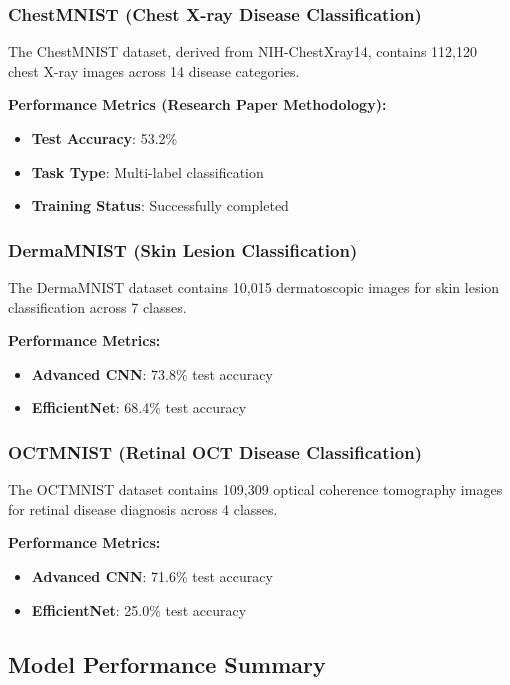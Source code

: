 \documentclass[12pt,a4paper]{article}
\begin{document}
\subsubsection{ChestMNIST (Chest X-ray Disease Classification)}

The ChestMNIST dataset, derived from NIH-ChestXray14, contains 112,120 chest X-ray images across 14 disease categories.

\textbf{Performance Metrics (Research Paper Methodology):}
\begin{itemize}
    \item \textbf{Test Accuracy}: 53.2\%
    \item \textbf{Task Type}: Multi-label classification
    \item \textbf{Training Status}: Successfully completed
\end{itemize}

\subsubsection{DermaMNIST (Skin Lesion Classification)}

The DermaMNIST dataset contains 10,015 dermatoscopic images for skin lesion classification across 7 classes.

\textbf{Performance Metrics:}
\begin{itemize}
    \item \textbf{Advanced CNN}: 73.8\% test accuracy
    \item \textbf{EfficientNet}: 68.4\% test accuracy
\end{itemize}

\subsubsection{OCTMNIST (Retinal OCT Disease Classification)}

The OCTMNIST dataset contains 109,309 optical coherence tomography images for retinal disease diagnosis across 4 classes.

\textbf{Performance Metrics:}
\begin{itemize}
    \item \textbf{Advanced CNN}: 71.6\% test accuracy
    \item \textbf{EfficientNet}: 25.0\% test accuracy
\end{itemize}

\subsection{Model Performance Summary}
\end{document}
